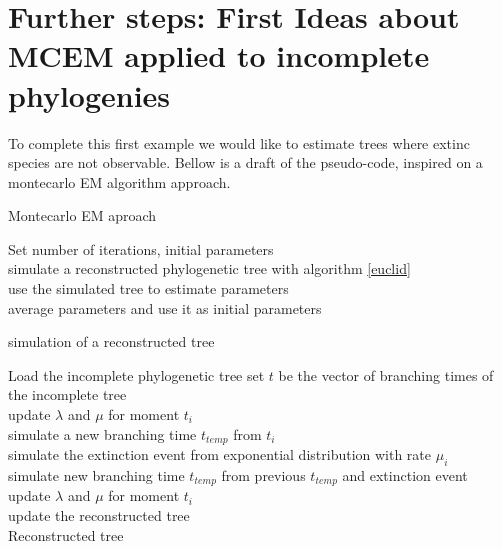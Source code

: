 \documentclass[]{article}
\begin{document}
\section*{Further steps: First Ideas about MCEM applied to incomplete phylogenies}

To complete this first example we would like to estimate trees where extinc species are not observable. Bellow is a draft of the pseudo-code, inspired on a montecarlo EM algorithm approach.\\

\begin{algorithm}
\caption{Montecarlo EM aproach}
\label{mcem}
\begin{algorithmic}[1]
\State Set number of iterations, initial parameters
\Repeat
{} \\
\qquad simulate a reconstructed phylogenetic tree with algorithm \ref{euclid}\\
\qquad use the simulated tree to estimate parameters 
\EndFor \\
average parameters and use it as initial parameters\\
 
\end{algorithmic}
\end{algorithm}




\begin{algorithm}
\caption{simulation of a reconstructed tree}
\label{euclid}
\begin{algorithmic}[1]
\State Load the incomplete phylogenetic tree
\State set $t$ be the vector of branching times of the incomplete tree
 \\
\quad	update $\lambda$ and $\mu$ for moment $t_i$ \\
\quad	simulate a new branching time $t_{temp}$ from $t_i$ 
	 \\
	 \qquad	simulate the extinction event from exponential distribution with rate $\mu_{i}$\\
	 \qquad	simulate new branching time $t_{temp}$ from previous $t_{temp}$ and extinction event\\
	\qquad	update $\lambda$ and $\mu$ for moment $t_i$
	\EndWhile\\
	update the reconstructed tree
\EndFor \\
\Return Reconstructed tree
 
\end{algorithmic}
\end{algorithm}
\end{document}
